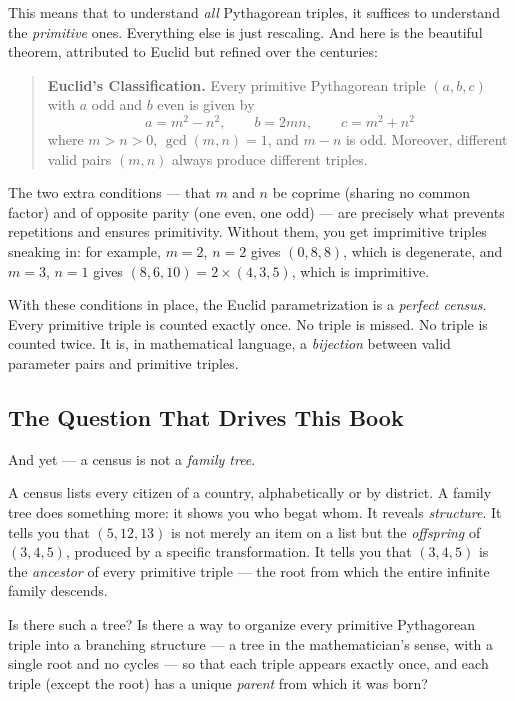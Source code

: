 \documentclass[11pt,twoside,openright]{book}
\theoremstyle{definition}
\theoremstyle{remark}
\begin{document}
This means that to understand \textit{all} Pythagorean triples, it suffices to understand the \textit{primitive} ones. Everything else is just rescaling. And here is the beautiful theorem, attributed to Euclid but refined over the centuries:

\begin{quote}
\textbf{Euclid's Classification.} Every primitive Pythagorean triple $(a, b, c)$ with $a$ odd and $b$ even is given by
$$a = m^2 - n^2, \qquad b = 2mn, \qquad c = m^2 + n^2$$
where $m > n > 0$, $\gcd(m, n) = 1$, and $m - n$ is odd. Moreover, different valid pairs $(m, n)$ always produce different triples.
\end{quote}
The two extra conditions --- that $m$ and $n$ be coprime (sharing no common factor) and of opposite parity (one even, one odd) --- are precisely what prevents repetitions and ensures primitivity. Without them, you get imprimitive triples sneaking in: for example, $m = 2$, $n = 2$ gives $(0, 8, 8)$, which is degenerate, and $m = 3$, $n = 1$ gives $(8, 6, 10) = 2 \times (4, 3, 5)$, which is imprimitive.

With these conditions in place, the Euclid parametrization is a \textit{perfect census}. Every primitive triple is counted exactly once. No triple is missed. No triple is counted twice. It is, in mathematical language, a \textit{bijection} between valid parameter pairs and primitive triples.


\subsection{The Question That Drives This Book}

And yet --- a census is not a \textit{family tree}.

A census lists every citizen of a country, alphabetically or by district. A family tree does something more: it shows you who begat whom. It reveals \textit{structure}. It tells you that $(5, 12, 13)$ is not merely an item on a list but the \textit{offspring} of $(3, 4, 5)$, produced by a specific transformation. It tells you that $(3, 4, 5)$ is the \textit{ancestor} of every primitive triple --- the root from which the entire infinite family descends.

Is there such a tree? Is there a way to organize every primitive Pythagorean triple into a branching structure --- a tree in the mathematician's sense, with a single root and no cycles --- so that each triple appears exactly once, and each triple (except the root) has a unique \textit{parent} from which it was born?
\end{document}
